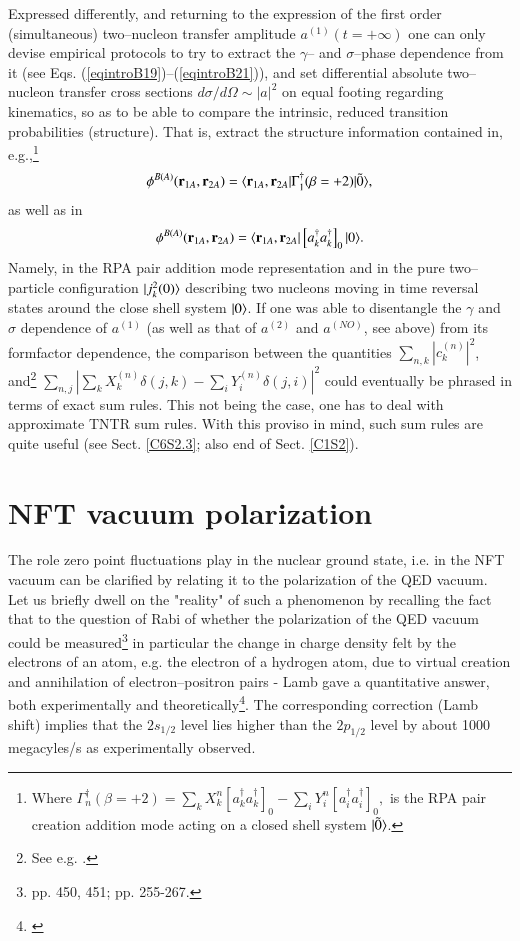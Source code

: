 \begin{subappendices}
 
 Expressed differently, and returning to the expression of the first order (simultaneous) two--nucleon transfer amplitude $a^{(1)}(t=+\infty)$ one can only devise empirical protocols to try to extract the $\gamma$-- and $\sigma$--phase dependence  from it (see Eqs. (\ref{eqintroB19})--(\ref{eqintroB21})), and set differential absolute two--nucleon transfer cross sections $d\sigma/d\Omega\sim |a|^2$ on equal footing regarding kinematics, so as to be able to compare the intrinsic, reduced transition probabilities (structure). That is, extract the structure information contained in, e.g.,\footnote{Where
 	$\Gamma_n^\dagger(\beta=+2)=\sum_k X_k^n\left[a^\dagger_ka^\dagger_k\right]_0-\sum_i Y^n_i \left[a^\dagger_i a^\dagger_i\right]_0,$
 	is the RPA pair creation addition mode acting on  a closed shell system $|{\tilde 0} \rangle$. }
 \begin{align}
 \phi^{B(A)}(\mathbf r_{1A},\mathbf r_{2A})=\langle {\mathbf r_{1A},\mathbf r_{2A}|\Gamma^\dagger_1(\beta=+2)|\tilde 0} \rangle,
 \end{align}
 as well as in
 \begin{align}
 \phi^{B(A)}(\mathbf r_{1A},\mathbf r_{2A})=\langle {\mathbf r_{1A},\mathbf r_{2A}}|\left[a^\dagger_ka^\dagger_k\right]_0|{0} \rangle.
 \end{align}
 Namely, in the RPA pair addition mode representation and in the pure two--particle configuration $|{j^2_k(0)} \rangle$ describing two nucleons moving in time reversal states around the close shell system $|{0} \rangle$. If one was able to disentangle the $\gamma$ and $\sigma$ dependence of $a^{(1)}$ (as well as that of $a^{(2)}$ and $a^{(NO)}$, see above) from its formfactor dependence, the comparison between the quantities $\sum_{n,k}|c^{(n)}_k|^2$, and\footnote{See e.g. \cite{Broglia:67}.} $\sum_{n,j}\left|\sum_kX^{(n)}_k\delta(j,k)-\sum_iY^{(n)}_i\delta(j,i)\right|^2$ could  eventually be phrased in terms of exact sum rules. This not being  the case, one has to  deal with approximate TNTR sum rules. With this proviso in mind, such sum rules are quite useful (see Sect. \ref{C6S2.3}; also end of Sect. \ref{C1S2}). 
 
 
 \section{NFT vacuum polarization}\label{App1.E}
 The role zero point fluctuations play in the nuclear ground state, i.e. in the NFT vacuum  can
 be  clarified by relating it to the polarization of the QED vacuum.
 Let us briefly dwell on the "reality" of such a phenomenon by recalling the fact that
 to the question of Rabi of whether the polarization of the QED vacuum could be measured\footnote{\cite{Pais:86} pp. 450, 451; \cite{Pais:00} pp. 255-267.} in particular
 the change in charge  density felt by the electrons of an atom,  e.g. the electron of a hydrogen atom, due to
 virtual creation and annihilation of electron--positron pairs - Lamb gave a quantitative answer, both experimentally
 and theoretically\footnote{\cite{Lamb:47,Kroll:49}}. The corresponding correction  (Lamb shift) implies that the $2s_{1/2}$ level lies 
 higher than the $2p_{1/2}$ level by about 1000 megacyles/s  as experimentally observed.
 

\end{subappendices}
